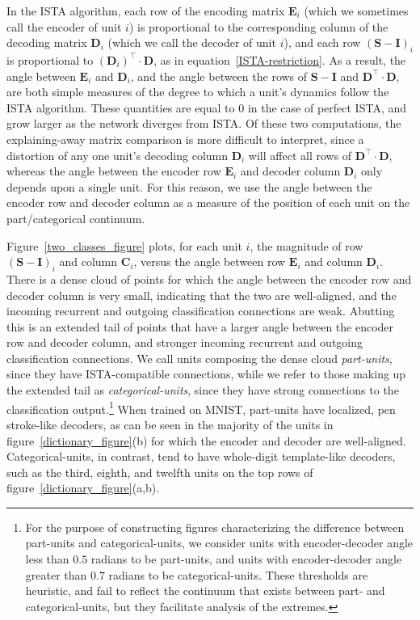 \documentclass{article} %
\newcommand{\C}{\mathbf{C}}
\newcommand{\D}{\mathbf{D}}
\newcommand{\E}{\mathbf{E}}
\newcommand{\I}{\mathbf{I}}
\newcommand{\Sm}{\mathbf{S}}
\begin{document}
In the ISTA algorithm, each row of the encoding matrix $\E_i$ (which we sometimes call the encoder of unit $i$) is proportional to the corresponding column of the decoding matrix $\D_i$ (which we call the decoder of unit $i$), and each row $\left( \Sm - \I \right)_i$ is proportional to $\left( \D_i \right)^\top \cdot \D$, as in equation~\ref{ISTA-restriction}.  As a result, the angle between $\E_i$ and $\D_i$, and the angle between the rows of $\Sm - \I$ and $\D^{\top} \cdot \D$, are both simple measures of the degree to which a unit's dynamics follow the ISTA algorithm.  These quantities are equal to $0$ in the case of perfect ISTA, and grow larger as the network diverges from ISTA.
Of these two computations, the explaining-away matrix comparison is more difficult to interpret, since a distortion of any one unit's decoding column $\D_i$ will affect all rows of $\D^{\top} \cdot \D$, whereas the angle between the encoder row $\E_i$ and decoder column $\D_i$ only depends upon a single unit. For this reason, we use the angle between the encoder row and decoder column as a measure of the position of each unit on the part/categorical continuum.  %

Figure~\ref{two_classes_figure} plots, for each unit $i$, the magnitude of row $\left( \Sm - \I \right)_i$ and column $\C_i$, versus the angle between row $\E_i$ and column $\D_i$.
There is a dense cloud of points for which the angle between the encoder row and decoder column is very small, indicating that the two are well-aligned, and the incoming recurrent and outgoing classification connections are weak.  Abutting this is an extended tail of points that have a larger angle between the encoder row and decoder column, and stronger incoming recurrent and outgoing classification connections.  We call units composing the dense cloud \emph{part-units}, since they have ISTA-compatible connections, while we refer to those making up the extended tail as \emph{categorical-units}, since they have strong connections to the classification output.\footnote{For the purpose of constructing figures characterizing the difference between part-units and categorical-units, we consider units with encoder-decoder angle less than $0.5$ radians to be part-units, and units with encoder-decoder angle greater than $0.7$ radians to be categorical-units.  These thresholds are heuristic, and fail to reflect the continuum that exists between part- and categorical-units, but they facilitate analysis of the extremes.}  When trained on MNIST, part-units have localized, pen stroke-like decoders, as can be seen in the majority of the units in figure~\ref{dictionary_figure}(b) for which the encoder and decoder are well-aligned.  Categorical-units, in contrast, tend to have whole-digit template-like decoders, such as the third, eighth, and twelfth units on the top rows of figure~\ref{dictionary_figure}(a,b).
\end{document}
